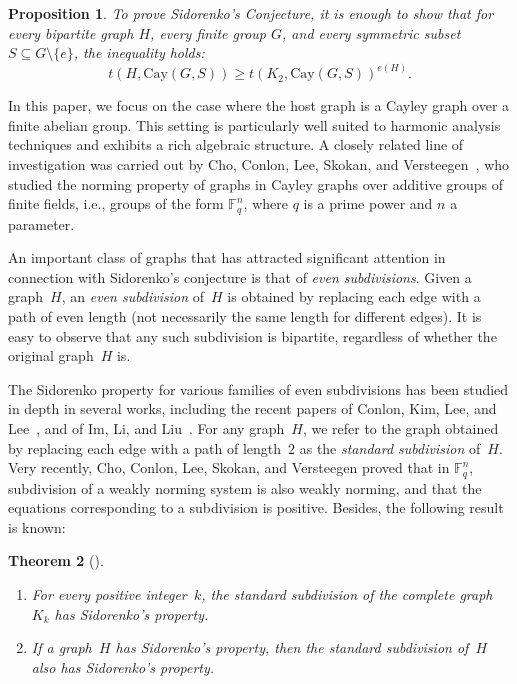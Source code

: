 \documentclass[12pt,a4paper]{article}
\newtheorem{theorem}{Theorem}[section]
\theoremstyle{definition}
\theoremstyle{plain}
\newtheorem{prop}[theorem]{Proposition}
\theoremstyle{definition}
\begin{document}
\begin{prop}
To prove Sidorenko's Conjecture, it is enough to show that for every bipartite graph $H$, every finite group $G$, and every symmetric subset $S \subseteq G \setminus \{e\}$, the inequality holds:
\[
   t(H, \mathrm{Cay}(G, S)) \geq t(K_2, \mathrm{Cay}(G, S))^{e(H)}.
\]
\end{prop}

In this paper, we focus on the case where the host graph is a Cayley graph over a finite abelian group. This setting is particularly well suited to harmonic analysis techniques and exhibits a rich algebraic structure. A closely related line of investigation was carried out by Cho, Conlon, Lee, Skokan, and Versteegen~\cite{cho2024norming}, who studied the norming property of graphs in Cayley graphs over additive groups of finite fields, i.e., groups of the form $\mathbb{F}_q^n$, where $q$ is a prime power and $n$ a parameter. 

An important class of graphs that has attracted significant attention in connection with Sidorenko's conjecture is that of \emph{even subdivisions}. Given a graph~$H$, an \emph{even subdivision} of~$H$ is obtained by replacing each edge with a path of even length (not necessarily the same length for different edges). It is easy to observe that any such subdivision is bipartite, regardless of whether the original graph~$H$ is.

The Sidorenko property for various families of even subdivisions has been studied in depth in several works, including the recent papers of Conlon, Kim, Lee, and Lee~\cite{conlon2018some}, and of Im, Li, and Liu~\cite{im2024sidorenko}. For any graph~$H$, we refer to the graph obtained by replacing each edge with a path of length~$2$ as the \emph{standard subdivision} of~$H$. Very recently, Cho, Conlon, Lee, Skokan, and Versteegen \cite{cho2024norming} proved that in $\mathbb{F}_q^n$, subdivision of a weakly norming system is also weakly norming, and that the equations corresponding to a subdivision is positive. Besides, the following result is known:

\begin{theorem}[\cite{conlon2018some}]
\leavevmode
\begin{enumerate}
    \item For every positive integer~$k$, the standard subdivision of the complete graph~$K_k$ has Sidorenko's property.
    \item If a graph~$H$ has Sidorenko's property, then the standard subdivision of~$H$ also has Sidorenko's property.
\end{enumerate}
\end{theorem}
\end{document}
